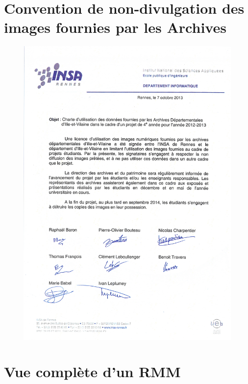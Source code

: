 \documentclass[a4paper]{article}
\begin{document}
\appendix


\section{Convention de non-divulgation des images fournies par les Archives}
\label{sec:annexe 3}

\begin{figure}[H]
\centering
\includegraphics[width=\textwidth]{Convention2013.pdf}
\end{figure}

\section{Vue compl\`ete d'un RMM}
\label{sec:annexe 1}
\end{document}
